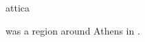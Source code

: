 \documentclass{stex}
\begin{document}
\begin{smodule}{attica}
\begin{sparagraph}[style=symdoc]
 was a region around Athens in .
\end{sparagraph}
\end{smodule}
\end{document}
